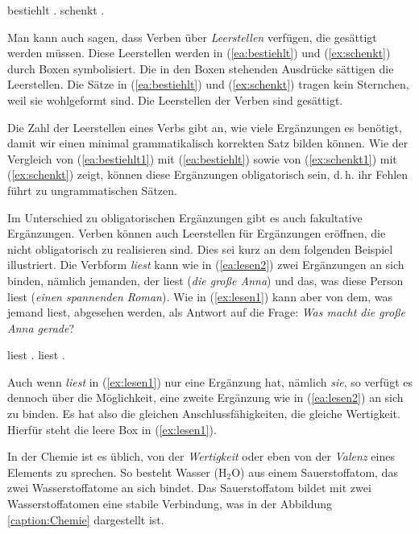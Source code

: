 \ea 
\ea \label{ea:bestiehlt}  bestiehlt .
\ex \label{ex:schenkt}  schenkt  .
\z 
\z 

Man kann auch sagen, dass Verben über \textit{Leerstellen} verfügen, die gesättigt werden müssen. Diese Leerstellen werden in (\ref{ea:bestiehlt}) und (\ref{ex:schenkt}) durch Boxen symbolisiert. Die in den Boxen stehenden Ausdrücke sättigen die Leerstellen. Die Sätze in (\ref{ea:bestiehlt}) und (\ref{ex:schenkt}) tragen kein Sternchen, weil sie wohlgeformt sind. Die Leerstellen der Verben sind gesättigt.

Die Zahl der Leerstellen eines Verbs gibt an, wie viele Ergänzungen es benötigt, damit wir einen minimal grammatikalisch korrekten Satz bilden können. Wie der Vergleich von (\ref{ea:bestiehlt1}) mit (\ref{ea:bestiehlt}) sowie von (\ref{ex:schenkt1}) mit (\ref{ex:schenkt}) zeigt, können diese Ergänzungen obligatorisch sein, d.\,h. ihr Fehlen führt zu ungrammatischen Sätzen. 

Im Unterschied zu obligatorischen Ergänzungen gibt es auch fakultative Ergänzungen. Verben können auch Leerstellen für Ergänzungen eröffnen, die nicht obligatorisch zu realisieren sind. Dies sei kurz an dem folgenden Beispiel illustriert. Die Verbform \textit{liest} kann wie in (\ref{ea:lesen2}) zwei Ergänzungen an sich binden, nämlich jemanden, der liest (\textit{die große Anna}) und das, was diese Person liest (\textit{einen spannenden Roman}). Wie in (\ref{ex:lesen1}) kann aber von dem, was jemand liest, abgesehen werden, \zB als Antwort auf die Frage: \textit{Was macht die große Anna gerade}? 

\ea \label{ea:fakultativeErg}
\ea \label{ea:lesen2}  liest .
\ex \label{ex:lesen1}  liest \fbox{\phantom{einen Text}}.
\z 
\z 

Auch wenn \textit{liest} in (\ref{ex:lesen1}) nur eine Ergänzung hat, nämlich \textit{sie}, so verfügt es dennoch über die Möglichkeit, eine zweite Ergänzung wie in (\ref{ea:lesen2}) an sich zu binden. Es hat also die gleichen Anschlussfähigkeiten, die gleiche Wertigkeit. Hierfür steht die leere Box in (\ref{ex:lesen1}).  

In der Chemie ist es üblich, von der \textit{Wertigkeit} oder eben von der \textit{Valenz} eines Elements zu sprechen. So besteht Wasser (H$_{2}$O) aus einem Sauerstoffatom, das zwei Wasserstoffatome an sich bindet. Das Sauerstoffatom bildet mit zwei Wasserstoffatomen eine stabile Verbindung, was in der Abbildung \ref{caption:Chemie} dargestellt ist.

